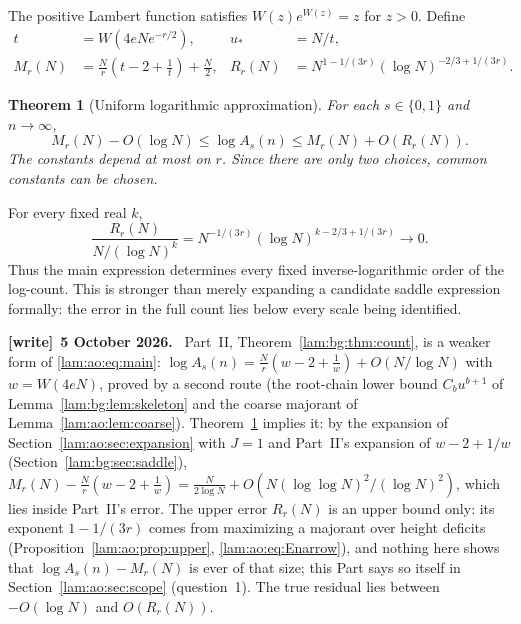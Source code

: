 \documentclass[11pt,a4paper]{article}
\numberwithin{equation}{section}
\newtheorem{theorem}{Theorem}[section]
\theoremstyle{remark}
\newenvironment{writenote}[1][]{\par\smallskip\begingroup\small
 \noindent\textbf{[write]}\if\relax\detokenize{#1}\relax\else~\textbf{#1.}\fi\ }%
 {\par\endgroup\smallskip}
\begin{document}
The positive Lambert function satisfies $W(z)e^{W(z)}=z$ for $z>0$. Define
\begin{align}
 t&=W(4eNe^{-r/2}),& u_*&=N/t,\label{lam:ao:eq:saddledef}\\
 M_r(N)&=\frac Nr\left(t-2+\frac1t\right)+\frac N2,&
 R_r(N)&=N^{1-1/(3r)}(\log N)^{-2/3+1/(3r)}.\label{lam:ao:eq:MR}
\end{align}
\begin{theorem}[Uniform logarithmic approximation]\label{lam:ao:thm:main}
For each $s\in\{0,1\}$ and $n\to\infty$,
\begin{equation}\label{lam:ao:eq:main}
 M_r(N)-O(\log N)\le\log A_s(n)\le M_r(N)+O(R_r(N)).
\end{equation}
The constants depend at most on $r$. Since there are only two choices, common constants can be chosen.
\end{theorem}
For every fixed real $k$,
\begin{equation}\label{lam:ao:eq:scale}
 \frac{R_r(N)}{N/(\log N)^k}
 =N^{-1/(3r)}(\log N)^{k-2/3+1/(3r)}\longrightarrow0.
\end{equation}
Thus the main expression determines every fixed inverse-logarithmic order of the log-count. This is stronger than merely expanding a candidate saddle expression formally: the error in the full count lies below every scale being identified.
\begin{writenote}[5 October 2026]
Part~II, Theorem~\ref{lam:bg:thm:count}, is a weaker form of \eqref{lam:ao:eq:main}: $\log A_s(n)=\frac Nr(w-2+\frac1w)+O(N/\log N)$ with $w=W(4eN)$, proved by a second route (the root-chain lower bound $C_bu^{b+1}$ of Lemma~\ref{lam:bg:lem:skeleton} and the coarse majorant of Lemma~\ref{lam:ao:lem:coarse}). Theorem~\ref{lam:ao:thm:main} implies it: by the expansion of Section~\ref{lam:ao:sec:expansion} with $J=1$ and Part~II's expansion of $w-2+1/w$ (Section~\ref{lam:bg:sec:saddle}), $M_r(N)-\frac Nr(w-2+\frac1w)=\frac N{2\log N}+O(N(\log\log N)^2/(\log N)^2)$, which lies inside Part~II's error. The upper error $R_r(N)$ is an upper bound only: its exponent $1-1/(3r)$ comes from maximizing a majorant over height deficits (Proposition~\ref{lam:ao:prop:upper}, \eqref{lam:ao:eq:Enarrow}), and nothing here shows that $\log A_s(n)-M_r(N)$ is ever of that size; this Part says so itself in Section~\ref{lam:ao:sec:scope} (question~1). The true residual lies between $-O(\log N)$ and $O(R_r(N))$.
\end{writenote}
\end{document}
